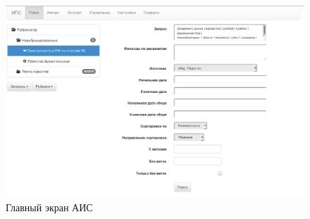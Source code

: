 \begin{figure}[h!]
\centering
\includegraphics[width=0.9\linewidth]{technology/gui_main}
\caption{Главный экран АИС}
\label{figure:guiMain}
\end{figure}

